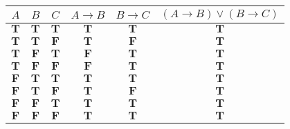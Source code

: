 \documentclass[preview]{standalone}
\begin{document}
\begin{center}
    \begin{tabular} {|c|c|c||c|c||c|}
    \hline 
    $A$          & $B$          & $C$          & $A \to B$  & $B \to C$      & $(A \to B) \vee (B \to C)$ \\ \hline
    $\mathbf{T}$ & $\mathbf{T}$ & $\mathbf{T}$ & $\mathbf{T}$ & $\mathbf{T}$ & $\mathbf{T}$   \\ \hline
    $\mathbf{T}$ & $\mathbf{T}$ & $\mathbf{F}$ & $\mathbf{T}$ & $\mathbf{F}$ & $\mathbf{T}$   \\ \hline
    $\mathbf{T}$ & $\mathbf{F}$ & $\mathbf{T}$ & $\mathbf{F}$ & $\mathbf{T}$ & $\mathbf{T}$   \\ \hline
    $\mathbf{T}$ & $\mathbf{F}$ & $\mathbf{F}$ & $\mathbf{F}$ & $\mathbf{T}$ & $\mathbf{T}$   \\ \hline
    $\mathbf{F}$ & $\mathbf{T}$ & $\mathbf{T}$ & $\mathbf{T}$ & $\mathbf{T}$ & $\mathbf{T}$   \\ \hline
    $\mathbf{F}$ & $\mathbf{T}$ & $\mathbf{F}$ & $\mathbf{T}$ & $\mathbf{F}$ & $\mathbf{T}$   \\ \hline
    $\mathbf{F}$ & $\mathbf{F}$ & $\mathbf{T}$ & $\mathbf{T}$ & $\mathbf{T}$ & $\mathbf{T}$   \\ \hline
    $\mathbf{F}$ & $\mathbf{F}$ & $\mathbf{F}$ & $\mathbf{T}$ & $\mathbf{T}$ & $\mathbf{T}$   \\ \hline
    \end{tabular}
\end{center}
\end{document}

